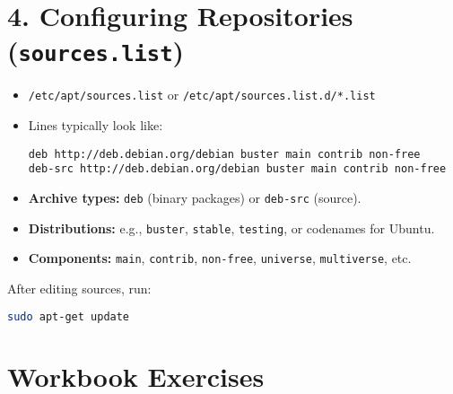 \documentclass[12pt,a4paper]{report}
\begin{document}
\section*{4. Configuring Repositories (\texttt{sources.list})}

\begin{itemize}
    \item \texttt{/etc/apt/sources.list} or \texttt{/etc/apt/sources.list.d/*.list}
    \item Lines typically look like:
    \begin{lstlisting}
deb http://deb.debian.org/debian buster main contrib non-free
deb-src http://deb.debian.org/debian buster main contrib non-free
    \end{lstlisting}
    \item \textbf{Archive types:} \texttt{deb} (binary packages) or \texttt{deb-src} (source).
    \item \textbf{Distributions:} e.g., \texttt{buster}, \texttt{stable}, \texttt{testing}, or codenames for Ubuntu.
    \item \textbf{Components:} \texttt{main}, \texttt{contrib}, \texttt{non-free}, \texttt{universe}, \texttt{multiverse}, etc.
\end{itemize}

After editing sources, run:
\begin{lstlisting}[language=bash]
sudo apt-get update
\end{lstlisting}

\section*{Workbook Exercises}
\end{document}
